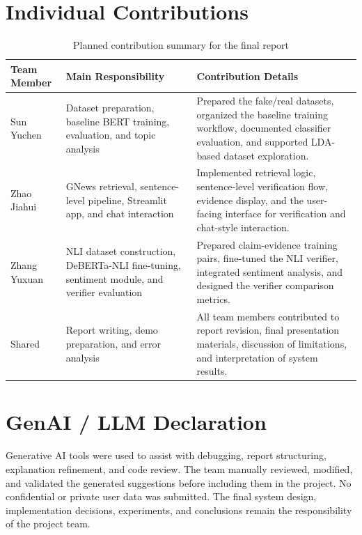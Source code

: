 \documentclass[11pt]{article}
\begin{document}
\section{Individual Contributions}

\begin{table}[H]
    \centering
    \caption{Planned contribution summary for the final report}
    \begin{tabularx}{\textwidth}{@{}p{}p{}Y@{}}
        \toprule
        \textbf{Team Member} & \textbf{Main Responsibility} & \textbf{Contribution Details} \\
        \midrule
        Sun Yuchen & Dataset preparation, baseline BERT training, evaluation, and topic analysis & Prepared the fake/real datasets, organized the baseline training workflow, documented classifier evaluation, and supported LDA-based dataset exploration. \\
        Zhao Jiahui & GNews retrieval, sentence-level pipeline, Streamlit app, and chat interaction & Implemented retrieval logic, sentence-level verification flow, evidence display, and the user-facing interface for verification and chat-style interaction. \\
        Zhang Yuxuan & NLI dataset construction, DeBERTa-NLI fine-tuning, sentiment module, and verifier evaluation & Prepared claim-evidence training pairs, fine-tuned the NLI verifier, integrated sentiment analysis, and designed the verifier comparison metrics. \\
        Shared & Report writing, demo preparation, and error analysis & All team members contributed to report revision, final presentation materials, discussion of limitations, and interpretation of system results. \\
        \bottomrule
    \end{tabularx}
\end{table}

\section{GenAI / LLM Declaration}

Generative AI tools were used to assist with debugging, report structuring,
explanation refinement, and code review. The team manually reviewed, modified,
and validated the generated suggestions before including them in the project. No
confidential or private user data was submitted. The final system design,
implementation decisions, experiments, and conclusions remain the
responsibility of the project team.
\end{document}
